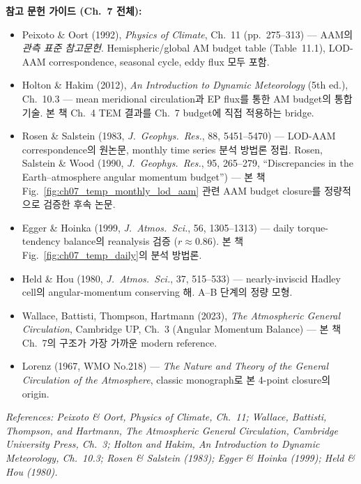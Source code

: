 \begin{hisublock}
\textbf{참고 문헌 가이드 (Ch.~7 전체):}
\begin{itemize}
  \item Peixoto \& Oort (1992), \textit{Physics of Climate}, Ch.~11 (pp.~275--313)
    --- AAM의 \emph{관측 표준 참고문헌}.  Hemispheric/global AM budget table
    (Table~11.1), LOD-AAM correspondence, seasonal cycle, eddy flux 모두 포함.
  \item Holton \& Hakim (2012), \textit{An Introduction to Dynamic Meteorology}
    (5th ed.), Ch.~10.3 --- mean meridional circulation과 EP flux를 통한 AM
    budget의 통합 기술. 본 책 Ch.~4 TEM 결과를 Ch.~7 budget에 직접 적용하는
    bridge.
  \item Rosen \& Salstein (1983, \textit{J.\ Geophys.\ Res.}, 88, 5451--5470)
    --- LOD-AAM correspondence의 원논문, monthly time series 분석 방법론
    정립.  Rosen, Salstein \& Wood (1990, \textit{J.\ Geophys.\ Res.}, 95,
    265--279, ``Discrepancies in the Earth--atmosphere angular momentum
    budget'') --- 본 책 Fig.~\ref{fig:ch07_temp_monthly_lod_aam} 관련 AAM
    budget closure를 정량적으로 검증한 후속 논문.
  \item Egger \& Hoinka (1999, \textit{J.\ Atmos.\ Sci.}, 56, 1305--1313)
    --- daily torque-tendency balance의 reanalysis 검증 ($r\approx 0.86$).
    본 책 Fig.~\ref{fig:ch07_temp_daily}의 분석 방법론.
  \item Held \& Hou (1980, \textit{J.\ Atmos.\ Sci.}, 37, 515--533)
    --- nearly-inviscid Hadley cell의 angular-momentum conserving 해.
    A--B 단계의 정량 모형.
  \item Wallace, Battisti, Thompson, Hartmann (2023), \textit{The Atmospheric
    General Circulation}, Cambridge UP, Ch.~3 (Angular Momentum Balance) ---
    본 책 Ch.~7의 구조가 가장 가까운 modern reference.
  \item Lorenz (1967, WMO No.218) --- \textit{The Nature and Theory of the
    General Circulation of the Atmosphere}, classic monograph로 본 4-point
    closure의 origin.
\end{itemize}
\end{hisublock}


\vspace{6pt}
\noindent\textit{References:
Peixoto \& Oort, \textit{Physics of Climate}, Ch.~11;
Wallace, Battisti, Thompson, and Hartmann, \textit{The Atmospheric General
Circulation}, Cambridge University Press, Ch.~3;
Holton and Hakim, \textit{An Introduction to Dynamic Meteorology},
Ch.~10.3;
Rosen \& Salstein (1983); Egger \& Hoinka (1999); Held \& Hou (1980).}
